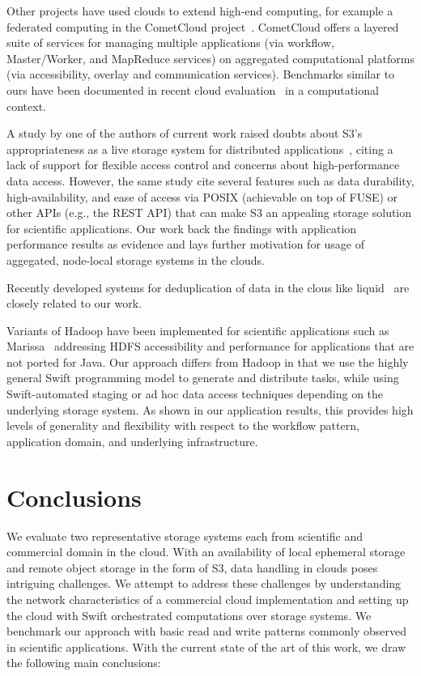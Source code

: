 \documentclass[10pt,journal,cspaper,compsoc]{IEEEtran}
\begin{document}
Other projects have used clouds to extend high-end computing, for example a
federated computing in the CometCloud project~\cite{cometcloud_web}. CometCloud
offers a layered suite of services for managing multiple applications (via
workflow, Master/Worker, and MapReduce services) on aggregated computational
platforms (via accessibility, overlay and communication services).  Benchmarks
similar to ours have been documented in recent cloud
evaluation~\cite{cloudefficacy} in a computational context.

A study by one of the authors of current work raised doubts about S3's
appropriateness as a live storage system for distributed
applications~\cite{s3-viable}, citing a lack of support for flexible access
control and concerns about high-performance data access. However, the same
study cite several features such as data durability, high-availability, and
ease of access via POSIX (achievable on top of FUSE) or other APIs (e.g., the
REST API) that can make S3 an appealing storage solution for scientific
applications. Our work back the findings with application performance results
as evidence and lays further motivation for usage of aggegated, node-local
storage systems in the clouds.

Recently developed systems for deduplication of data in the clous like
liquid~\cite{liquid:2014} are closely related to our work.

Variants of Hadoop have been implemented for scientific
applications such as Marissa~\cite{marissa} addressing HDFS
accessibility and performance for applications that are not ported for
Java. Our approach differs from Hadoop in that we use the highly general
Swift programming model to generate and distribute tasks, while using
Swift-automated staging or ad hoc data access techniques depending on
the underlying storage system.  As shown in our application results,
this provides high levels of generality and flexibility with respect
to the workflow pattern, application domain, and underlying
infrastructure. 

\section{Conclusions}\label{sec:concl}
We evaluate two representative storage systems each from scientific and
commercial domain in the cloud. With an availability of local ephemeral storage
and remote object storage in the form of S3, data handling in clouds poses
intriguing challenges.  We attempt to address these challenges by understanding
the network characteristics of a commercial cloud implementation and setting up
the cloud with Swift orchestrated computations over storage systems. We
benchmark our approach with basic read and write patterns commonly observed in
scientific applications. With the current state of the art of this work, we
draw the following main conclusions:
\end{document}
